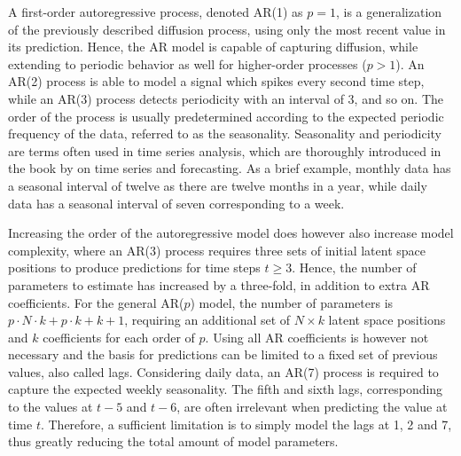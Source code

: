     A first-order autoregressive process, denoted AR(1) as $p=1$, is a generalization of the previously described diffusion process, using only the most recent value in its prediction. Hence, the AR model is capable of capturing diffusion, while extending to periodic behavior as well for higher-order processes ($p>1$). 
    An AR(2) process is able to model a signal which spikes every second time step, while an AR(3) process detects periodicity with an interval of 3, and so on. 
    The order of the process is usually predetermined according to the expected periodic frequency of the data, referred to as the seasonality.
    Seasonality and periodicity are terms often used in time series analysis, which are thoroughly introduced in the book \cite{brockwell2016introduction} by \citeauthor{brockwell2016introduction} on time series and forecasting.
    As a brief example, monthly data has a seasonal interval of twelve as there are twelve months in a year, while daily data has a seasonal interval of seven corresponding to a week.
    
    Increasing the order of the autoregressive model does however also increase model complexity, where an AR(3) process requires three sets of initial latent space positions to produce predictions for time steps $t\geq3$. Hence, the number of parameters to estimate has increased by a three-fold, in addition to extra AR coefficients. For the general AR($p$) model, the number of parameters is $p\cdot N\cdot k + p\cdot k + k + 1$, requiring an additional set of $N\times k$ latent space positions and $k$ coefficients for each order of $p$.
    Using all AR coefficients is however not necessary and the basis for predictions can be limited to a fixed set of previous values, also called lags. Considering daily data, an AR(7) process is required to capture the expected weekly seasonality. The fifth and sixth lags, corresponding to the values at $t-5$ and $t-6$, are often irrelevant when predicting the value at time $t$. Therefore, a sufficient limitation is to simply model the lags at 1, 2 and 7, thus greatly reducing the total amount of model parameters.
    
